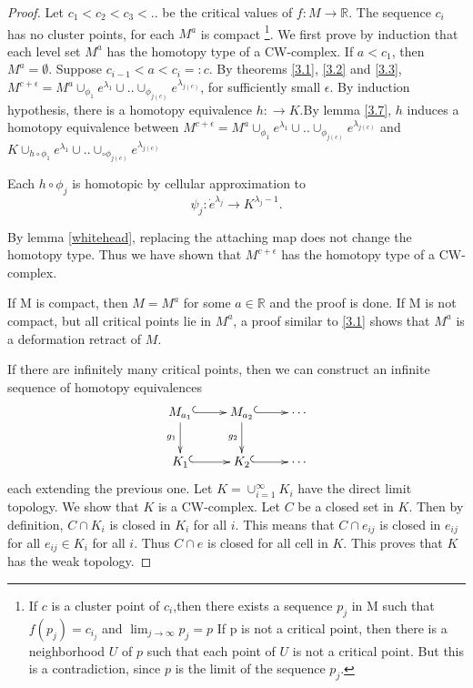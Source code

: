 \documentclass[a4paper,11pt,reqno]{amsart}
\newcommand{\RR}{\mathbb{R}}      %
\begin{document}
\begin{proof}
  Let $c_1 < c_2 < c_3 < ..$ be the critical values of $f: M \to \RR$. The
  sequence ${c_i}$ has no cluster points, for each $M^a$ is compact \footnote{If
    $c$ is a cluster point of ${c_i}$,then there exists a sequence ${p_j}$ in M
    such that $f(p_j) = c_{i_j}$ and $\lim_{j \to \infty} p_j = p$ If p is not a
    critical point, then there is a neighborhood $U$ of $p$ such that each point
    of $U$ is not a critical point. But this is a contradiction, since $p$ is
    the limit of the sequence ${p_j}$.}. We first prove by induction that each
  level set $M^a$ has the homotopy type of a CW-complex. If $a < c_1$, then $M^a
  = \emptyset$. Suppose $c_{i-1} < a < c_{i} =: c$. By theorems \ref{3.1},
  \ref{3.2} and \ref{3.3}, $M^{c+\epsilon} = M^a \cup_{\phi_1} e^{\lambda_1}
  \cup .. \cup_{\phi_{j(c)}} e^{\lambda_{j(c)}}$, for sufficiently small
  $\epsilon$. By induction hypothesis, there is a homotopy equivalence $h : \to
  K$.By lemma \ref{3.7}, $h$ induces a homotopy equivalence between
  $M^{c+\epsilon} = M^a \cup_{\phi_1} e^{\lambda_1} \cup .. \cup_{\phi_{j(c)}}
  e^{\lambda_{j(c)}}$ and $K \cup_{h\circ\phi_1} e^{\lambda_1} \cup
  .. \cup_{\circ\phi_{j(c)}} e^{\lambda_{j(c)}}$

  Each $h \circ \phi_j$ is homotopic by cellular approximation to
  \begin{equation}
    \psi_j: \dot{e}^{\lambda_j} \to K^{\lambda_j-1}.
  \end{equation}

  By lemma \ref{whitehead}, replacing the attaching map does not
  change the homotopy type. Thus we have shown that $M^{c+\epsilon}$
  has the homotopy type of a CW-complex.

  If M is compact, then $M = M^a$ for some $a \in \RR$ and the proof is done. If
  M is not compact, but all critical points lie in $M^a$, a proof similar to
  \ref{3.1} shows that $M^a$ is a deformation retract of $M$.

  If there are infinitely many critical points, then we can construct an
  infinite sequence of homotopy equivalences
  \begin{equation*}
    \xymatrix@C+0em@R+0em{
      M_{a_1} \ar[d]_{g_1} \ar@{^(->}[r] &
      M_{a_2} \ar[d]_{g_2} \ar@{^(->}[r]&\cdots \\
      K_1 \ar@{^(->}[r] & K_2 \ar@{^(->}[r] &\cdots
    }
  \end{equation*}
  each extending the previous one. Let $K = \cup_{i=1}^{\infty}K_i$ have the
  direct limit topology. We show that $K$ is a CW-complex. Let $C$ be a closed
  set in $K$. Then by definition, $C\cap K_i$ is closed in $K_i$ for all
  $i$. This means that $C\cap e_{ij}$ is closed in $e_{ij}$ for all $e_{ij} \in
  K_i$ for all $i$. Thus $C \cap e$ is closed for all cell in $K$. This proves
  that $K$ has the weak topology.


\end{proof}
\end{document}
